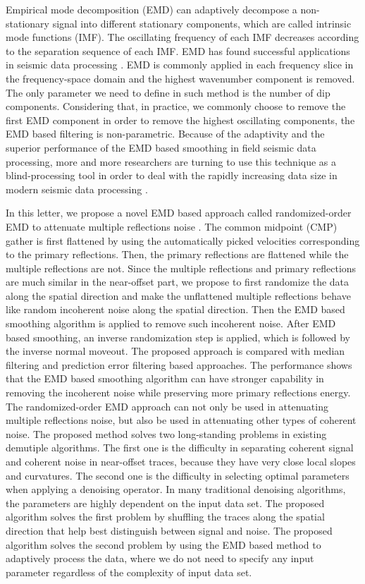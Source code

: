 Empirical mode decomposition (EMD) \cite{huangemd} can adaptively decompose a non-stationary signal into different stationary components, which are called intrinsic mode functions (IMF). The oscillating frequency of each IMF decreases according to the separation sequence of each IMF.  EMD has found successful applications in seismic data processing \cite{yangkang20141,yangkang2016emd}.  EMD is commonly applied in each frequency slice in the frequency-space domain and the highest wavenumber component is removed.  The only parameter we need to define in such method is the number of dip components. Considering that, in practice, we commonly choose to remove the first EMD component in order to remove the highest oscillating components, the EMD based filtering is non-parametric. Because of the adaptivity and the superior performance of the EMD based smoothing in field seismic data processing, more and more researchers are turning to use this technique as a blind-processing tool in order to deal with the rapidly increasing data size in modern seismic data processing \cite{yangkang2015enhemd}. 

In this letter, we propose a novel EMD based approach called randomized-order EMD to attenuate multiple reflections noise \cite{carvalho1992,fomel20095,weglein2003,weglein2013}. The common midpoint (CMP) gather is first flattened by using the automatically picked velocities \cite{fomel20091} corresponding to the primary reflections. Then, the primary reflections are flattened while the multiple reflections are not. Since the multiple reflections and primary reflections are much similar in the near-offset part, we propose to first randomize the data along the spatial direction and make the unflattened multiple reflections behave like random incoherent noise along the spatial direction. Then the EMD based smoothing algorithm is applied to remove such incoherent noise. After EMD based smoothing, an inverse randomization step is applied, which is followed by the inverse normal moveout. The proposed approach is compared with median filtering and prediction error filtering based approaches. The performance shows that the EMD based smoothing algorithm can have stronger capability in removing the incoherent noise while preserving more primary reflections energy. The randomized-order EMD approach can not only be used in attenuating multiple reflections noise, but also be used in attenuating other types of coherent noise. The proposed method solves two long-standing problems in existing demutiple algorithms. The first one is the difficulty in separating coherent signal and coherent noise in near-offset traces, because they have very close local slopes and curvatures. The second one is the difficulty in selecting optimal parameters when applying a denoising operator. In many traditional denoising algorithms, the parameters are highly dependent on the input data set. The proposed algorithm solves the first problem by shuffling the traces along the spatial direction that help best distinguish between signal and noise. The proposed algorithm solves the second problem by using the EMD based method to adaptively process the data, where we do not need to specify any input parameter regardless of the complexity of input data set.


